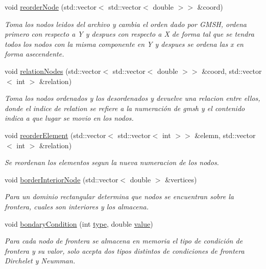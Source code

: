\begin{DoxyCompactItemize}
void \hyperlink{class_mesh_a1a49aea1d3aa8ccf4f8acd367906b4ab}{reorder\+Node} (std\+::vector$<$ std\+::vector$<$ double $>$$>$ \&coord)
\begin{DoxyCompactList}\small\item\em Toma los nodos leidos del archivo y cambia el orden dado por G\+M\+SH, ordena primero con respecto a Y y despues con respecto a X de forma tal que se tendra todos los nodos con la misma componente en Y y despues se ordena las x en forma asecendente. \end{DoxyCompactList}\item 
void \hyperlink{class_mesh_a88e3d635b654e3122774b3e49770648e}{relation\+Nodes} (std\+::vector$<$ std\+::vector$<$ double $>$$>$ \&coord, std\+::vector$<$ int $>$ \&relation)
\begin{DoxyCompactList}\small\item\em Toma los nodos ordenados y los desordenados y devuelve una relacion entre ellos, donde el indice de relation se refiere a la numeración de gmsh y el contenido indica a que lugar se movio en los nodos. \end{DoxyCompactList}\item 
void \hyperlink{class_mesh_a7972a36435ea43732b4611a3765c28f6}{reorder\+Element} (std\+::vector$<$ std\+::vector$<$ int $>$$>$ \&elemn, std\+::vector$<$ int $>$ \&relation)
\begin{DoxyCompactList}\small\item\em Se reordenan los elementos segun la nueva numeracion de los nodos. \end{DoxyCompactList}\item 
void \hyperlink{class_mesh_a8da1c7918301eaf9f6c71979247d2d94}{border\+Interior\+Node} (std\+::vector$<$ double $>$ \&vertices)
\begin{DoxyCompactList}\small\item\em Para un dominio rectangular determina que nodos se encuentran sobre la frontera, cuales son interiores y los almacena. \end{DoxyCompactList}\item 
void \hyperlink{class_mesh_abe2ade2afc588a69ae7793eac37babfe}{bondary\+Condition} (int \hyperlink{class_mesh_aef283d305e17ab48771999e7835ed294}{type}, double \hyperlink{class_mesh_adef108df36f29f4880a9233075e04210}{value})
\begin{DoxyCompactList}\small\item\em Para cada nodo de frontera se almacena en memoria el tipo de condición de frontera y su valor, solo acepta dos tipos distintos de condiciones de frontera Dirchelet y Neumman. \end{DoxyCompactList}\item 
$$
\end{DoxyCompactItemize}
